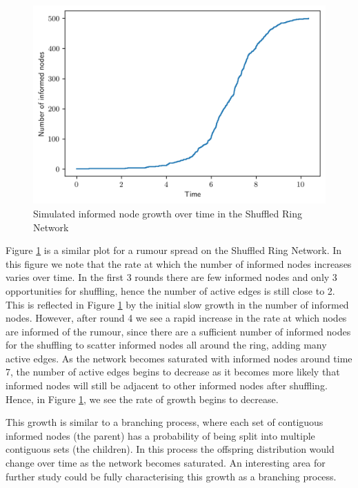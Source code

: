\begin{figure}[h]
	\centering
	\includegraphics[width=\textwidth]{./figures/shuffled_ring_informed_node_growth.png}
	\caption{Simulated informed node growth over time in the Shuffled Ring Network}
	\label{fig:shuffledRingInformedNodeGrowth}
\end{figure}

Figure \ref{fig:shuffledRingInformedNodeGrowth} is a similar plot for a rumour spread on the Shuffled Ring Network. In this figure we note that the rate at which the number of informed nodes increases varies over time. In the first 3 rounds there are few informed nodes and only 3 opportunities for shuffling, hence the number of active edges is still close to 2. This is reflected in Figure \ref{fig:shuffledRingInformedNodeGrowth} by the initial slow growth in the number of informed nodes. However, after round 4 we see a rapid increase in the rate at which nodes are informed of the rumour, since there are a sufficient number of informed nodes for the shuffling to scatter informed nodes all around the ring, adding many active edges. 
As the network becomes saturated with informed nodes around time 7, the number of active edges begins to decrease as it becomes more likely that informed nodes will still be adjacent to other informed nodes after shuffling. Hence, in Figure \ref{fig:shuffledRingInformedNodeGrowth}, we see the rate of growth begins to decrease.

This growth is similar to a branching process, where each set of contiguous informed nodes (the parent) has a probability of being split into multiple contiguous sets (the children). In this process the offspring distribution would change over time as the network becomes saturated. An interesting area for further study could be fully characterising this growth as a branching process.

